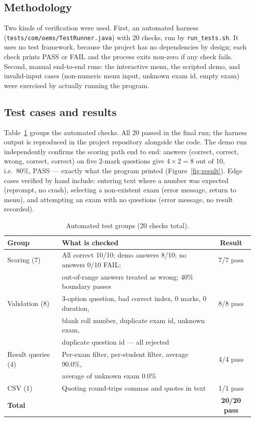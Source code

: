 \documentclass[11pt,a4paper]{article}
\begin{document}
\subsection{Methodology}
Two kinds of verification were used. First, an automated harness
(\texttt{tests/com/oems/TestRunner.java}) with 20 checks, run by
\texttt{run\_tests.sh}. It uses no test framework, because the project has no
dependencies by design; each check prints PASS or FAIL and the process exits
non-zero if any check fails. Second, manual end-to-end runs: the interactive
menu, the scripted demo, and invalid-input cases (non-numeric menu input,
unknown exam id, empty exam) were exercised by actually running the program.

\subsection{Test cases and results}
Table~\ref{tab:tests} groups the automated checks. All 20 passed in the final
run; the harness output is reproduced in the project repository alongside the
code. The demo run independently confirms the scoring path end to end: answers
(correct, correct, wrong, correct, correct) on five 2-mark questions give
$4 \times 2 = 8$ out of 10, i.e.\ 80\%, PASS --- exactly what the program printed
(Figure~\ref{fig:result}). Edge cases verified by hand include: entering text
where a number was expected (reprompt, no crash), selecting a non-existent exam
(error message, return to menu), and attempting an exam with no questions
(error message, no result recorded).

\begin{table}[H]
\centering
\caption{Automated test groups (20 checks total).}
\label{tab:tests}
\begin{tabular}{@{}p{4.2cm}p{7.2cm}c@{}}
\toprule
\textbf{Group} & \textbf{What is checked} & \textbf{Result} \\
\midrule
Scoring (7) & All correct 10/10; demo answers 8/10; no answers 0/10 FAIL; & 7/7 pass \\
& out-of-range answers treated as wrong; 40\% boundary passes & \\
Validation (8) & 3-option question, bad correct index, 0 marks, 0 duration, & 8/8 pass \\
& blank roll number, duplicate exam id, unknown exam, & \\
& duplicate question id --- all rejected & \\
Result queries (4) & Per-exam filter, per-student filter, average 90.0\%, & 4/4 pass \\
& average of unknown exam 0.0\% & \\
CSV (1) & Quoting round-trips commas and quotes in text & 1/1 pass \\
\midrule
\textbf{Total} & & \textbf{20/20 pass} \\
\bottomrule
\end{tabular}
\end{table}
\end{document}
